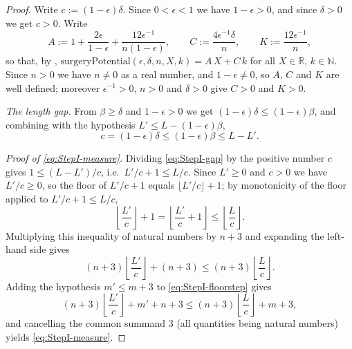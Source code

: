 \begin{proof}
  Write $c := (1-\epsilon)\delta$. Since $0<\epsilon<1$ we have $1-\epsilon>0$, and since
  $\delta>0$ we get $c>0$. Write
  \[
    A := 1 + \frac{2\epsilon}{1-\epsilon} + \frac{12\epsilon^{-1}}{n(1-\epsilon)}
    , \qquad
    C := \frac{4\epsilon^{-1}\delta}{n}
    , \qquad
    K := \frac{12\epsilon^{-1}}{n}
    ,
  \]
  so that, by ,
  $\mathrm{surgeryPotential}(\epsilon,\delta,n,X,k) = A\,X + C\,k$ for all $X \in \mathbb{R}$,
  $k \in \mathbb{N}$. Since $n>0$ we have $n \ne 0$ as a real number, and $1-\epsilon\ne0$, so
  $A$, $C$ and $K$ are well defined; moreover $\epsilon^{-1}>0$, $n>0$ and $\delta>0$ give
  $C>0$ and $K>0$.

  \emph{The length gap.} From $\beta\ge\delta$ and $1-\epsilon>0$ we get
  $(1-\epsilon)\delta \le (1-\epsilon)\beta$, and combining with the hypothesis
  $L' \le L - (1-\epsilon)\beta$,
  \begin{equation}
    \label{eq:StepI-gap}
    c = (1-\epsilon)\delta \le (1-\epsilon)\beta \le L - L'
    .
  \end{equation}

  \emph{Proof of \eqref{eq:StepI-measure}.} Dividing \eqref{eq:StepI-gap} by the positive number
  $c$ gives $1 \le (L-L')/c$, i.e.\ $L'/c + 1 \le L/c$. Since $L'\ge0$ and $c>0$ we have
  $L'/c \ge 0$, so the floor of $L'/c + 1$ equals $\lfloor L'/c\rfloor + 1$; by monotonicity of
  the floor applied to $L'/c+1 \le L/c$,
  \[
    \left\lfloor \frac{L'}{c} \right\rfloor + 1
      = \left\lfloor \frac{L'}{c} + 1 \right\rfloor
      \le \left\lfloor \frac{L}{c} \right\rfloor
    .
  \]
  Multiplying this inequality of natural numbers by $n+3$ and expanding the left-hand side gives
  \begin{equation}
    \label{eq:StepI-floorstep}
    (n+3)\left\lfloor \frac{L'}{c} \right\rfloor + (n+3)
      \le (n+3)\left\lfloor \frac{L}{c} \right\rfloor
    .
  \end{equation}
  Adding the hypothesis $m' \le m+3$ to \eqref{eq:StepI-floorstep} gives
  \[
    (n+3)\left\lfloor \frac{L'}{c} \right\rfloor + m' + n + 3
      \le (n+3)\left\lfloor \frac{L}{c} \right\rfloor + m + 3
    ,
  \]
  and cancelling the common summand $3$ (all quantities being natural numbers) yields
  \eqref{eq:StepI-measure}.


\end{proof}
